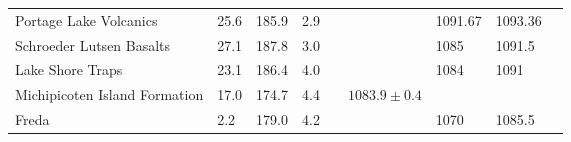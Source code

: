 \begin{tabular}{p{3cm} p{0.8cm} p{0.8cm} p{0.8cm} p{4cm} p{2.0cm} p{1.2cm} p{1.2cm} p{4.0cm}}
                   Portage Lake Volcanics &      25.6 &     185.9 &       2.9 &           \citet{books1972paleomagnetism, hnat2006primary} &                     &        1091.67 &        1093.36 &                          \citet{swanson2016new} \\
                 Schroeder Lutsen Basalts &      27.1 &     187.8 &       3.0 &            \citet{tauxe2009paleosecular, fairchild2016end} &                     &           1085 &         1091.5 &                        \citet{fairchild2016end} \\
                         Lake Shore Traps &      23.1 &     186.4 &       4.0 &  \citet{diehl1994paleomagnetic, kulakov2013paleomagnetism} &                     &           1084 &           1091 &                        \citet{fairchild2016end} \\
            Michipicoten Island Formation &      17.0 &     174.7 &       4.4 &         \citet{palmer1987paleomagnetism, fairchild2016end} &    $1083.9 \pm 0.4$ &                &                &                        \citet{fairchild2016end} \\
                                    Freda &       2.2 &     179.0 &       4.2 &                            \citet{henry1977paleomagnetism} &                     &           1070 &         1085.5 &                        \citet{fairchild2016end} \\
\bottomrule
\end{tabular}
